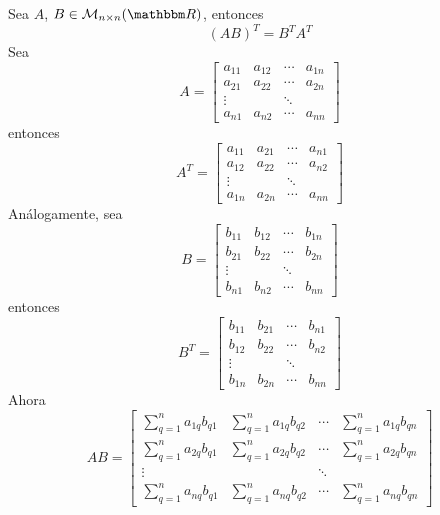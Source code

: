 \begin{theorem}\label{theo:matrixtranspu}
    Sea $A$, $B \in \mathcal{M}_{n \times n}(\RR)$, entonces
    $$(AB)^T = B^TA^T$$
    \demostracion
    Sea
    $$A = \begin{bmatrix}
        a_{11} & a_{12} & \cdots & a_{1n}\\
        a_{21} & a_{22} & \cdots & a_{2n}\\
        \vdots &  & \ddots & \\
        a_{n1} & a_{n2} & \cdots & a_{nn}
    \end{bmatrix}$$
    entonces
    $$A^T = \begin{bmatrix}
        a_{11} & a_{21} & \cdots & a_{n1}\\
        a_{12} & a_{22} & \cdots & a_{n2}\\
        \vdots &  & \ddots & \\
        a_{1n} & a_{2n} & \cdots & a_{nn}
    \end{bmatrix}$$
    Análogamente, sea
    $$B = \begin{bmatrix}
        b_{11} & b_{12} & \cdots & b_{1n}\\
        b_{21} & b_{22} & \cdots & b_{2n}\\
        \vdots &  & \ddots & \\
        b_{n1} & b_{n2} & \cdots & b_{nn}
    \end{bmatrix}$$
    entonces
    $$B^T = \begin{bmatrix}
        b_{11} & b_{21} & \cdots & b_{n1}\\
        b_{12} & b_{22} & \cdots & b_{n2}\\
        \vdots &  & \ddots & \\
        b_{1n} & b_{2n} & \cdots & b_{nn}
    \end{bmatrix}$$
    Ahora
    $$AB = \begin{bmatrix}
        \displaystyle\sum_{q=1}^{n} a_{1q}b_{q1} & \displaystyle\sum_{q=1}^{n} a_{1q}b_{q2} & \cdots & \displaystyle\sum_{q=1}^{n} a_{1q}b_{qn} \\
        \displaystyle\sum_{q=1}^{n} a_{2q}b_{q1} & \displaystyle\sum_{q=1}^{n} a_{2q}b_{q2} & \cdots & \displaystyle\sum_{q=1}^{n} a_{2q}b_{qn} \\
        \vdots & & \ddots & \\
        \displaystyle\sum_{q=1}^{n} a_{nq}b_{q1} & \displaystyle\sum_{q=1}^{n} a_{nq}b_{q2} & \cdots & \displaystyle\sum_{q=1}^{n} a_{nq}b_{qn}
    \end{bmatrix}$$

\end{theorem}
